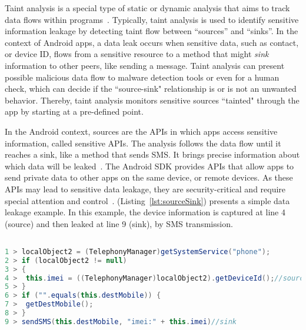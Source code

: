 Taint analysis is a special type of static or dynamic analysis that aims to track data flows within programs~\cite{DBLP:conf/sigsoft/PauckBW18}. Typically, taint analysis is used to identify sensitive information leakage by detecting taint flow between ``sources'' and ``sinks''. In the context of Android apps, a data leak occurs when sensitive data, such as contact, or device ID, flows from a sensitive resource to a method that might \emph{sink} information to other peers, like sending a message. Taint analysis can present possible malicious data flow to malware detection tools or even for a human check, which can decide if the ``source-sink" relationship is or is not an unwanted behavior. Thereby, taint analysis monitors sensitive sources ``tainted" through the app by starting at a pre-defined point. 

In the Android context, sources are the APIs in which apps access sensitive information, called sensitive APIs. The analysis follows the data flow until it reaches a sink, like a method that sends SMS. It brings precise information about which data will be leaked~\cite{DBLP:conf/pldi/ArztRFBBKTOM14}. The Android SDK provides APIs that allow apps to send private data to other apps on the same device, or remote devices. As these APIs may lead to sensitive data leakage, they are security-critical and require special attention and control~\cite{DBLP:conf/osdi/EnckGCCJMS10}. (Listing~\ref{lst:sourceSink}) presents a simple data leakage example. In this example, the device information is captured at line 4 (source) and then leaked at line 9 (sink), by SMS transmission.


\begin{lstlisting}[caption={Simple Data Leakage},
      language=Java, basicstyle=\fontsize{8}{6}\selectfont\ttfamily,
      label={lst:sourceSink}]

1 > localObject2 = (TelephonyManager)getSystemService("phone");
2 > if (localObject2 != null)
3 > {
4 >  this.imei = ((TelephonyManager)localObject2).getDeviceId();//source
5 > }
6 > if ("".equals(this.destMobile)) {
7 >  getDestMobile();
8 > }
9 > sendSMS(this.destMobile, "imei:" + this.imei)//sink
\end{lstlisting}


